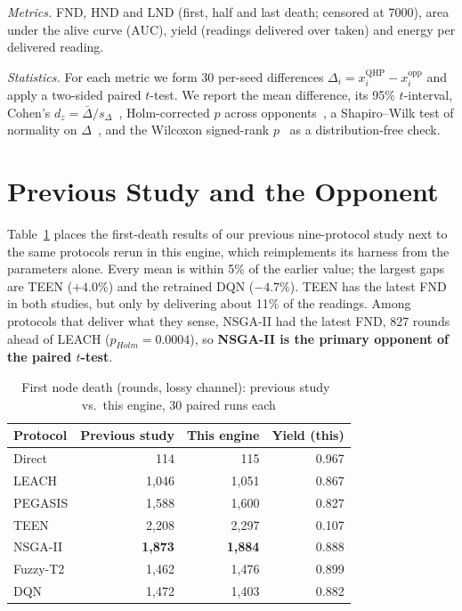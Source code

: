 \documentclass[conference]{IEEEtran}
\begin{document}
\emph{Metrics.} FND, HND and LND (first, half and last death; censored at 7000), area under the alive curve (AUC), yield (readings delivered over taken) and energy per delivered reading.

\emph{Statistics.} For each metric we form 30 per-seed differences $\Delta_i=x_i^{\text{QHP}}-x_i^{\text{opp}}$ and apply a two-sided paired $t$-test. We report the mean difference, its 95\% $t$-interval, Cohen's $d_z=\bar\Delta/s_\Delta$~\cite{cohen1988power}, Holm-corrected $p$ across opponents~\cite{holm1979simple}, a Shapiro--Wilk test of normality on $\Delta$~\cite{shapiro1965analysis}, and the Wilcoxon signed-rank $p$~\cite{wilcoxon1945individual} as a distribution-free check.

\section{Previous Study and the Opponent}
Table~\ref{tab:prev} places the first-death results of our previous nine-protocol study next to the same protocols rerun in this engine, which reimplements its harness from the parameters alone. Every mean is within 5\% of the earlier value; the largest gaps are TEEN ($+4.0\%$) and the retrained DQN ($-4.7\%$). TEEN has the latest FND in both studies, but only by delivering about 11\% of the readings. Among protocols that deliver what they sense, NSGA-II had the latest FND, 827 rounds ahead of LEACH ($p_{Holm}{=}0.0004$), so \textbf{NSGA-II is the primary opponent of the paired $t$-test}.

\begin{table}[t]
\caption{First node death (rounds, lossy channel): previous study~\cite{sharma2026unified} vs.\ this engine, 30 paired runs each}
\label{tab:prev}
\centering\footnotesize
\begin{tabular}{@{}lrrr@{}}
\toprule
Protocol & Previous study & This engine & Yield (this)\\
\midrule
Direct & 114 & 115 & 0.967\\
LEACH & 1,046 & 1,051 & 0.867\\
PEGASIS & 1,588 & 1,600 & 0.827\\
TEEN & 2,208 & 2,297 & 0.107\\
NSGA-II & \textbf{1,873} & \textbf{1,884} & 0.888\\
Fuzzy-T2 & 1,462 & 1,476 & 0.899\\
DQN & 1,472 & 1,403 & 0.882\\
\bottomrule
\end{tabular}
\end{table}
\end{document}
